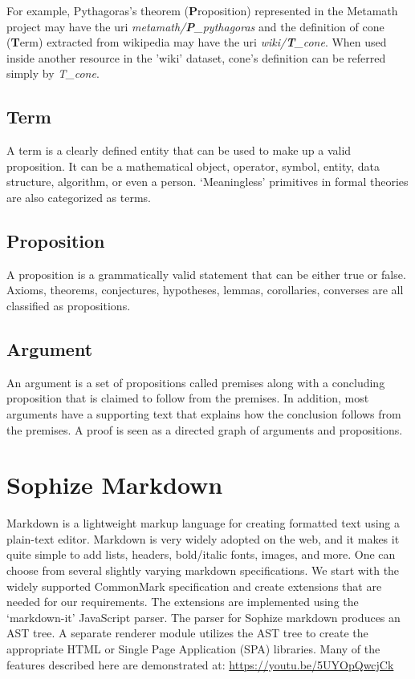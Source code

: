 \documentclass[a4paper]{article}
\begin{document}
For example, Pythagoras's theorem (\textbf{P}roposition) represented in the Metamath project may have the uri \emph{metamath/\textbf{P}\_pythagoras} and the definition of cone (\textbf{T}erm) extracted from wikipedia may have the uri \emph{wiki/\textbf{T}\_cone}. When used inside another resource in the 'wiki' dataset, cone's definition can be referred simply by \emph{T\_cone}.


\subsection*{Term}

A term is a clearly defined entity that can be used to make up a valid proposition. It can be a mathematical object, operator, symbol, entity, data structure, algorithm, or even a person. `Meaningless' primitives in formal theories are also categorized as terms.


\subsection*{Proposition}

A proposition is a grammatically valid statement that can be either true or false. Axioms, theorems, conjectures, hypotheses, lemmas, corollaries, converses are all classified as propositions.


\subsection*{Argument}

An argument is a set of propositions called premises along with a concluding proposition that is claimed to follow from the premises. In addition, most arguments have a supporting text that explains how the conclusion follows from the premises. A proof is seen as a directed graph of arguments and propositions.


\section{Sophize Markdown}

Markdown is a lightweight markup language for creating formatted text using a plain-text editor. Markdown is very widely adopted on the web, and it makes it quite simple to add lists, headers, bold/italic fonts, images, and more. One can choose from several slightly varying markdown specifications. We start with the widely supported CommonMark specification and create extensions that are needed for our requirements. The extensions are implemented using the `markdown-it' \cite{markdown_it} JavaScript parser. The parser for Sophize markdown produces an AST tree. A separate renderer module utilizes the AST tree to create the appropriate HTML or Single Page Application (SPA) libraries. Many of the features described here are demonstrated at: \url{https://youtu.be/5UYOpQwcjCk}
\end{document}
